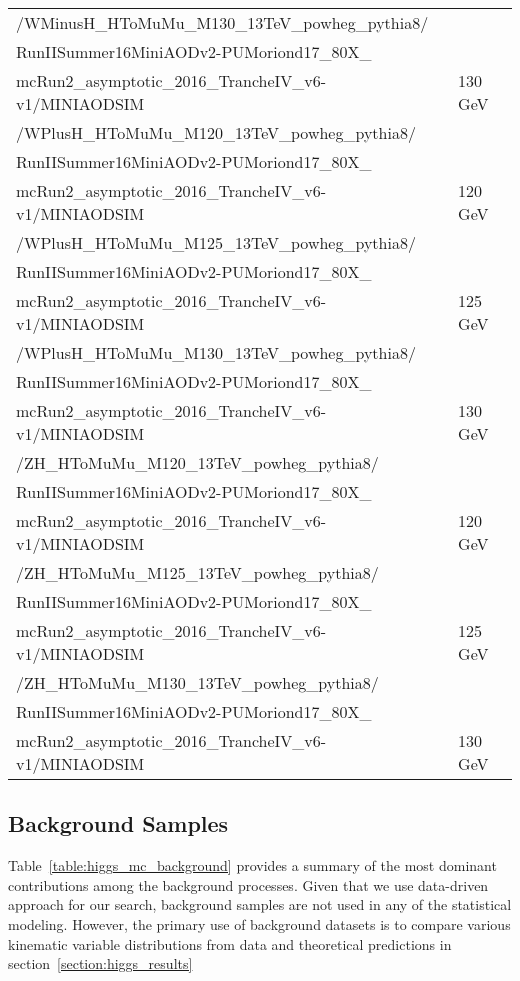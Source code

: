 \begin{table}[!h]
\begin{center}
\begin{tabular}{|l|l|}
            /WMinusH\_HToMuMu\_M130\_13TeV\_powheg\_pythia8/\\RunIISummer16MiniAODv2-PUMoriond17\_80X\_\\mcRun2\_asymptotic\_2016\_TrancheIV\_v6-v1/MINIAODSIM & 130 GeV\\
            \hline
            /WPlusH\_HToMuMu\_M120\_13TeV\_powheg\_pythia8/\\RunIISummer16MiniAODv2-PUMoriond17\_80X\_\\mcRun2\_asymptotic\_2016\_TrancheIV\_v6-v1/MINIAODSIM & 120 GeV\\
            /WPlusH\_HToMuMu\_M125\_13TeV\_powheg\_pythia8/\\RunIISummer16MiniAODv2-PUMoriond17\_80X\_\\mcRun2\_asymptotic\_2016\_TrancheIV\_v6-v1/MINIAODSIM & 125 GeV\\
            /WPlusH\_HToMuMu\_M130\_13TeV\_powheg\_pythia8/\\RunIISummer16MiniAODv2-PUMoriond17\_80X\_\\mcRun2\_asymptotic\_2016\_TrancheIV\_v6-v1/MINIAODSIM & 130 GeV\\
            \hline
            /ZH\_HToMuMu\_M120\_13TeV\_powheg\_pythia8/\\RunIISummer16MiniAODv2-PUMoriond17\_80X\_\\mcRun2\_asymptotic\_2016\_TrancheIV\_v6-v1/MINIAODSIM & 120 GeV\\
            /ZH\_HToMuMu\_M125\_13TeV\_powheg\_pythia8/\\RunIISummer16MiniAODv2-PUMoriond17\_80X\_\\mcRun2\_asymptotic\_2016\_TrancheIV\_v6-v1/MINIAODSIM & 125 GeV\\
            /ZH\_HToMuMu\_M130\_13TeV\_powheg\_pythia8/\\RunIISummer16MiniAODv2-PUMoriond17\_80X\_\\mcRun2\_asymptotic\_2016\_TrancheIV\_v6-v1/MINIAODSIM & 130 GeV\\
            \hline
        \end{tabular}
    \end{center}
\end{table}

\subsection{Background Samples} \label{subsection:higgs_mc_background}
Table~\ref{table:higgs_mc_background} provides a summary of the most dominant contributions among the background processes. Given that we use data-driven approach for our search, background samples are not used in any of the statistical modeling. However, the primary use of background datasets is to compare various kinematic variable distributions from data and theoretical predictions in section~\ref{section:higgs_results}


